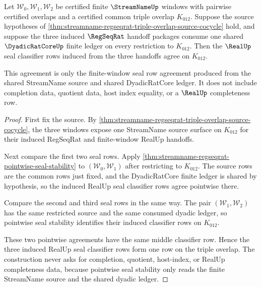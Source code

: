 \begin{theorem}
\label{thm:streamname-regseqrat-triple-overlap-seal-cocycle}
Let $\mathcal{W}_0,\mathcal{W}_1,\mathcal{W}_2$ be certified finite
$\StreamNameUp$ windows with pairwise certified overlaps and a certified common
triple overlap $K_{012}$. Suppose the source hypotheses of
\autoref{thm:streamname-regseqrat-triple-overlap-source-cocycle} hold, and
suppose the three induced $\RegSeqRat$ handoff packages consume one shared
$\DyadicRatCoreUp$ finite ledger on every restriction to $K_{012}$. Then the
$\RealUp$ seal classifier rows induced from the three handoffs agree on
$K_{012}$.

This agreement is only the finite-window seal row agreement produced from the
shared StreamName source and shared DyadicRatCore ledger. It does not include
completion data, quotient data, host index equality, or a $\RealUp$
completeness row.
\end{theorem}
\begin{proof}
First fix the source. By
\autoref{thm:streamname-regseqrat-triple-overlap-source-cocycle}, the three
windows expose one StreamName source surface on $K_{012}$ for their induced
RegSeqRat and finite-window RealUp handoffs.

Next compare the first two seal rows. Apply
\autoref{thm:streamname-regseqrat-pointwise-seal-stability} to
$(\mathcal{W}_0,\mathcal{W}_1)$ after restricting to $K_{012}$. The source rows
are the common rows just fixed, and the DyadicRatCore finite ledger is shared by
hypothesis, so the induced RealUp seal classifier rows agree pointwise there.

Compare the second and third seal rows in the same way. The pair
$(\mathcal{W}_1,\mathcal{W}_2)$ has the same restricted source and the same
consumed dyadic ledger, so pointwise seal stability identifies their induced
classifier rows on $K_{012}$.

These two pointwise agreements have the same middle classifier row. Hence the
three induced RealUp seal classifier rows form one row on the triple overlap.
The construction never asks for completion, quotient, host-index, or RealUp
completeness data, because pointwise seal stability only reads the finite
StreamName source and the shared dyadic ledger.
\end{proof}

